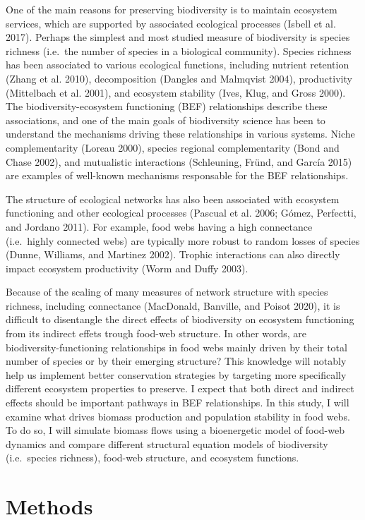 \documentclass[10pt,oneside]{article}
\begin{document}
One of the main reasons for preserving biodiversity is to maintain
ecosystem services, which are supported by associated ecological
processes (Isbell et al. 2017). Perhaps the simplest and most studied
measure of biodiversity is species richness (i.e.~the number of species
in a biological community). Species richness has been associated to
various ecological functions, including nutrient retention (Zhang et al.
2010), decomposition (Dangles and Malmqvist 2004), productivity
(Mittelbach et al. 2001), and ecosystem stability (Ives, Klug, and Gross
2000). The biodiversity-ecosystem functioning (BEF) relationships
describe these associations, and one of the main goals of biodiversity
science has been to understand the mechanisms driving these
relationships in various systems. Niche complementarity (Loreau 2000),
species regional complementarity (Bond and Chase 2002), and mutualistic
interactions (Schleuning, Fründ, and García 2015) are examples of
well-known mechanisms responsable for the BEF relationships.

The structure of ecological networks has also been associated with
ecosystem functioning and other ecological processes (Pascual et al.
2006; Gómez, Perfectti, and Jordano 2011). For example, food webs having
a high connectance (i.e.~highly connected webs) are typically more
robust to random losses of species (Dunne, Williams, and Martinez 2002).
Trophic interactions can also directly impact ecosystem productivity
(Worm and Duffy 2003).

Because of the scaling of many measures of network structure with
species richness, including connectance (MacDonald, Banville, and Poisot
2020), it is difficult to disentangle the direct effects of biodiversity
on ecosystem functioning from its indirect effets trough food-web
structure. In other words, are biodiversity-functioning relationships in
food webs mainly driven by their total number of species or by their
emerging structure? This knowledge will notably help us implement better
conservation strategies by targeting more specifically different
ecosystem properties to preserve. I expect that both direct and indirect
effects should be important pathways in BEF relationships. In this
study, I will examine what drives biomass production and population
stability in food webs. To do so, I will simulate biomass flows using a
bioenergetic model of food-web dynamics and compare different structural
equation models of biodiversity (i.e.~species richness), food-web
structure, and ecosystem functions.

\hypertarget{methods}{%
\section{Methods}\label{methods}}
\end{document}
